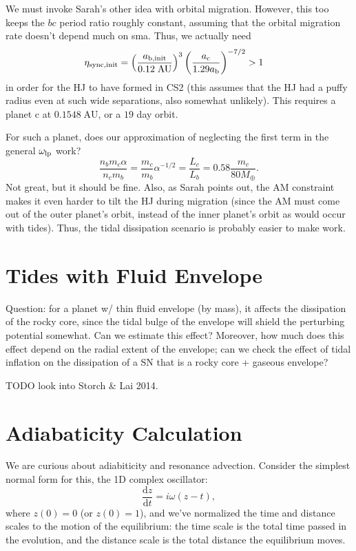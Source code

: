 \documentclass[12pt]{article}
\newcommand*{\rd}[2]{\frac{\mathrm{d}#1}{\mathrm{d}#2}}
\newcommand*{\p}[1]{\left(#1\right)}
\begin{document}
We must invoke Sarah's other idea with orbital migration. However, this too
keeps the $bc$ period ratio roughly constant, assuming that the orbital
migration rate doesn't depend much on sma. Thus, we actually need
\begin{align}
    \eta_{\rm sync, init}
        &= \p{\frac{a_{\rm b, init}}{0.12\;\mathrm{AU}}}^{3}
            \p{\frac{a_{\rm c}}{1.29 a_{\rm b}}}^{-7/2} > 1
\end{align}
in order for the HJ to have formed in CS2 (this assumes that the HJ had a puffy
radius even at such wide separations, also somewhat unlikely). This requires a
planet c at $0.1548\;\mathrm{AU}$, or a $19$ day orbit.

For such a planet, does our approximation of neglecting the first term in
the general $\omega_{\rm lp}$ work?
\begin{equation}
    \frac{n_bm_c\alpha}{n_cm_b}
        = \frac{m_c}{m_b}\alpha^{-1/2} = \frac{L_c}{L_b} = 0.58
            \frac{m_c}{80M_{\oplus}}.
\end{equation}
Not great, but it should be fine. Also, as Sarah points out, the AM constraint
makes it even harder to tilt the HJ during migration (since the AM must come out
of the outer planet's orbit, instead of the inner planet's orbit as would occur
with tides). Thus, the tidal dissipation scenario is probably easier to make
work.

\section{Tides with Fluid Envelope}

Question: for a planet w/ thin fluid envelope (by mass), it affects the
dissipation of the rocky core, since the tidal bulge of the envelope will shield
the perturbing potential somewhat. Can we estimate this effect? Moreover, how
much does this effect depend on the radial extent of the envelope; can we check
the effect of tidal inflation on the dissipation of a SN that is a rocky core +
gaseous envelope?

TODO look into Storch \& Lai 2014.

\section{Adiabaticity Calculation}

We are curious about adiabiticity and resonance advection. Consider the simplest
normal form for this, the 1D complex oscillator:
\begin{equation}
    \rd{z}{t} = i\omega\p{z - t},
\end{equation}
where $z(0) = 0$ (or $z(0) = 1$), and we've normalized the time and distance
scales to the motion of the equilibrium: the time scale is the total time passed
in the evolution, and the distance scale is the total distance the equilibrium
moves.
\end{document}
